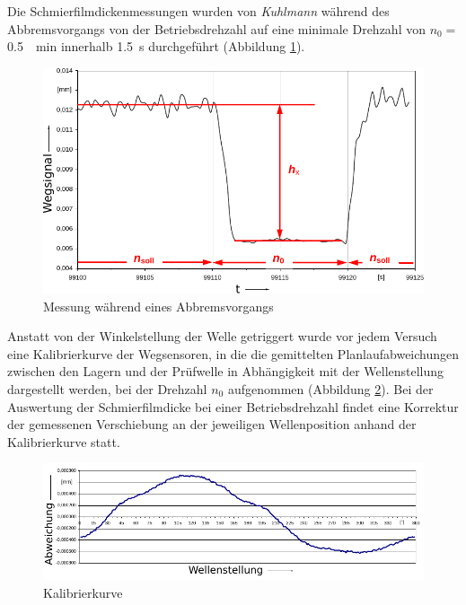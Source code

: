 Die Schmierfilmdickenmessungen wurden von \textit{Kuhlmann} während des Abbremsvorgangs von der Betriebsdrehzahl auf eine minimale Drehzahl von $n_0 =$ \SI{0.5}{\per\minute} innerhalb \SI{1.5}{\second} durchgeführt (Abbildung \ref{fig:differenzmessung_kuhlmann}).
\begin{figure}[htb]
    \centering
    \includegraphics[]{./images/differenzmessung_kuhlmann.pdf}
    \caption{Messung während eines Abbremsvorgangs \cite{kuhlmann_2009}}
    \label{fig:differenzmessung_kuhlmann}
\end{figure}
%

Anstatt von der Winkelstellung der Welle getriggert wurde vor jedem Versuch eine Kalibrierkurve der Wegsensoren, in die die gemittelten Planlaufabweichungen zwischen den Lagern und der Prüfwelle in Abhängigkeit mit der Wellenstellung dargestellt werden, bei der Drehzahl $n_0$ aufgenommen (Abbildung \ref{fig:kalibrierkurve_kuhlmann}).
Bei der Auswertung der Schmierfilmdicke bei einer Betriebsdrehzahl findet eine Korrektur der gemessenen Verschiebung an der jeweiligen Wellenposition anhand der Kalibrierkurve statt.
\begin{figure}[htb]
    \centering
    \includegraphics[]{./images/kalibrierkurve_kuhlmann.pdf}
    \caption{Kalibrierkurve \cite{kuhlmann_2009}}
    \label{fig:kalibrierkurve_kuhlmann}
\end{figure}
%

